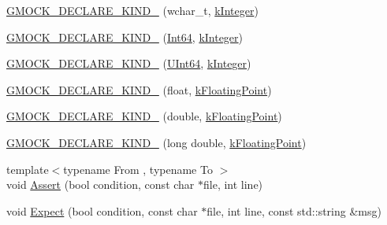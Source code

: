 \begin{DoxyCompactItemize}
\item 
\mbox{\hyperlink{namespacetesting_1_1internal_af00aa2679c10ed170064e5ec5dd80e29}{G\+M\+O\+C\+K\+\_\+\+D\+E\+C\+L\+A\+R\+E\+\_\+\+K\+I\+N\+D\+\_\+}} (wchar\+\_\+t, \mbox{\hyperlink{namespacetesting_1_1internal_aa8747bda20137c9aa7f846dee830e686a8a52f0fd73e05da35c45d80653633cab}{k\+Integer}})
\item 
\mbox{\hyperlink{namespacetesting_1_1internal_ae1d4cd9aef9a240d257364691ed3679e}{G\+M\+O\+C\+K\+\_\+\+D\+E\+C\+L\+A\+R\+E\+\_\+\+K\+I\+N\+D\+\_\+}} (\mbox{\hyperlink{namespacetesting_1_1internal_a271c563fec38b804ddab0677f51f70a8}{Int64}}, \mbox{\hyperlink{namespacetesting_1_1internal_aa8747bda20137c9aa7f846dee830e686a8a52f0fd73e05da35c45d80653633cab}{k\+Integer}})
\item 
\mbox{\hyperlink{namespacetesting_1_1internal_ae09394c3d07a5d99308fc3bbc9edc877}{G\+M\+O\+C\+K\+\_\+\+D\+E\+C\+L\+A\+R\+E\+\_\+\+K\+I\+N\+D\+\_\+}} (\mbox{\hyperlink{namespacetesting_1_1internal_aa6a1ac454e6d7e550fa4925c62c35caa}{U\+Int64}}, \mbox{\hyperlink{namespacetesting_1_1internal_aa8747bda20137c9aa7f846dee830e686a8a52f0fd73e05da35c45d80653633cab}{k\+Integer}})
\item 
\mbox{\hyperlink{namespacetesting_1_1internal_ad4ebf1b53b79ac38fbd18ccf4d63ceca}{G\+M\+O\+C\+K\+\_\+\+D\+E\+C\+L\+A\+R\+E\+\_\+\+K\+I\+N\+D\+\_\+}} (float, \mbox{\hyperlink{namespacetesting_1_1internal_aa8747bda20137c9aa7f846dee830e686acdce59b8c136926ace18aa9c2995878d}{k\+Floating\+Point}})
\item 
\mbox{\hyperlink{namespacetesting_1_1internal_a45748f4c08b868cb4939081769cdc7b1}{G\+M\+O\+C\+K\+\_\+\+D\+E\+C\+L\+A\+R\+E\+\_\+\+K\+I\+N\+D\+\_\+}} (double, \mbox{\hyperlink{namespacetesting_1_1internal_aa8747bda20137c9aa7f846dee830e686acdce59b8c136926ace18aa9c2995878d}{k\+Floating\+Point}})
\item 
\mbox{\hyperlink{namespacetesting_1_1internal_af46fdd94d8aea0da729b554de443315f}{G\+M\+O\+C\+K\+\_\+\+D\+E\+C\+L\+A\+R\+E\+\_\+\+K\+I\+N\+D\+\_\+}} (long double, \mbox{\hyperlink{namespacetesting_1_1internal_aa8747bda20137c9aa7f846dee830e686acdce59b8c136926ace18aa9c2995878d}{k\+Floating\+Point}})
\item 
{\footnotesize template$<$typename From , typename To $>$ }\\void \mbox{\hyperlink{namespacetesting_1_1internal_a7a259643b7f2d23ce2b757728df42c99}{Assert}} (bool condition, const char $\ast$file, int line)
\item 
void \mbox{\hyperlink{namespacetesting_1_1internal_ad93379317e10862a77b9fb90aa96e083}{Expect}} (bool condition, const char $\ast$file, int line, const std\+::string \&msg)

\end{DoxyCompactItemize}
